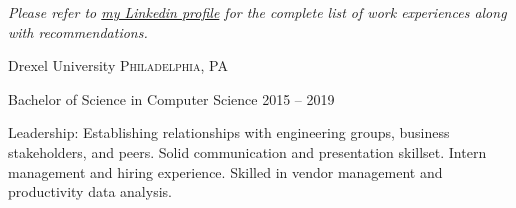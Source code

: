 \documentclass[10pt,a4paper]{article} %
\begin{document}

\begin{center}
\textit{Please refer to \href{https://www.linkedin.com/in/beefybeefy/}{my Linkedin profile} for the complete list of work experiences along with recommendations.}
\end{center}


\spacedhrule{-0.2em}{-0.4em} %



\headedsection %
{Drexel University}
{\textsc{Philadelphia, PA}} {

\headedsubsection %
{Bachelor of Science in Computer Science}
{2015 -- 2019}
{}
}




\inlineheadsection %
{Leadership:}
{Establishing relationships with engineering groups, business stakeholders, and peers. Solid communication and presentation skillset. Intern management and hiring experience. Skilled in vendor management and productivity data analysis.}

\end{document}
